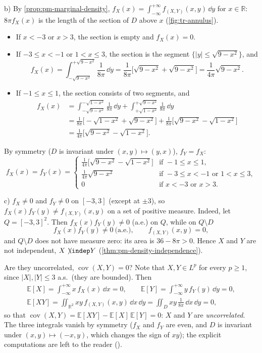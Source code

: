 \begin{example}
b) By \cref{prop:pm-marginal-density}, $f_X(x)=\int_{-\infty}^{+\infty}f_{(X,Y)}(x,y)\,\dd y$ for
$x\in\mathbb R$: $8\pi f_X(x)$ is the length of the section of $D$ above $x$
(\cref{fig:tr-annulus}).
\begin{itemize}
  \item If $x<-3$ or $x>3$, the section is empty and $f_X(x)=0$.
  \item If $-3\le x<-1$ or $1<x\le3$, the section is the segment
    $\{|y|\le\sqrt{9-x^2}\}$, and
    \[
      f_X(x)=\int_{-\sqrt{9-x^2}}^{+\sqrt{9-x^2}}\frac1{8\pi}\,\dd y=\frac1{8\pi}\Big[\sqrt{9-x^2}+\sqrt{9-x^2}\Big]
      =\frac1{4\pi}\sqrt{9-x^2}.
    \]
  \item If $-1\le x\le1$, the section consists of two segments, and
    \[
    \begin{aligned}
      f_X(x)&=\int_{-\sqrt{9-x^2}}^{-\sqrt{1-x^2}}\frac1{8\pi}\,\dd y+\int_{+\sqrt{1-x^2}}^{+\sqrt{9-x^2}}\frac1{8\pi}\,\dd y\\
      &=\frac1{8\pi}\Big[-\sqrt{1-x^2}+\sqrt{9-x^2}\Big]+\frac1{8\pi}\Big[\sqrt{9-x^2}-\sqrt{1-x^2}\Big]\\
      &=\frac1{4\pi}\Big[\sqrt{9-x^2}-\sqrt{1-x^2}\Big].
    \end{aligned}
    \]
\end{itemize}
By symmetry ($D$ is invariant under $(x,y)\mapsto(y,x)$), $f_Y=f_X$:
\[
  f_X(x)=f_Y(x)=\begin{cases}
    \frac1{4\pi}\big[\sqrt{9-x^2}-\sqrt{1-x^2}\big]&\text{if }-1\le x\le1,\\[3pt]
    \frac1{4\pi}\sqrt{9-x^2}&\text{if }-3\le x<-1\text{ or }1<x\le3,\\[3pt]
    0&\text{if }x<-3\text{ or }x>3.
  \end{cases}
\]

c) $f_X\ne0$ and $f_Y\ne0$ on $[-3,3]$ (except at $\pm3$), so $f_X(x)f_Y(y)\ne f_{(X,Y)}(x,y)$
on a set of positive measure. Indeed, let $Q=[-3,3]^2$. Then $f_X(x)f_Y(y)\ne0$ (a.e.) on $Q$,
while on $Q\setminus D$
\[
  f_X(x)f_Y(y)\ne0\ \text{(a.e.)},\qquad f_{(X,Y)}(x,y)=0,
\]
and $Q\setminus D$ does not have measure zero: its area is $36-8\pi>0$. Hence $X$ and $Y$ are not
independent, $X\not\!\indep Y$ (\cref{thm:pm-density-independence}).

Are they uncorrelated, $\operatorname{cov}(X,Y)=0$? Note that $X,Y\in L^p$ for every $p\ge1$,
since $|X|,|Y|\le3$ a.s.\ (they are bounded). Then
\[
\begin{gathered}
  \mathbb E[X]=\int_{-\infty}^{+\infty}x\,f_X(x)\,\dd x=0,\qquad
  \mathbb E[Y]=\int_{-\infty}^{+\infty}y\,f_Y(y)\,\dd y=0,\\
  \mathbb E[XY]=\iint_{\mathbb R^2}xy\,f_{(X,Y)}(x,y)\,\dd x\,\dd y=\iint_Dxy\,\frac1{8\pi}\,\dd x\,\dd y=0,
\end{gathered}
\]
so that $\operatorname{cov}(X,Y)=\mathbb E[XY]-\mathbb E[X]\,\mathbb E[Y]=0$: $X$ and $Y$ are
\emph{uncorrelated}. The three integrals vanish by symmetry ($f_X$ and $f_Y$ are even, and $D$ is
invariant under $(x,y)\mapsto(-x,y)$, which changes the sign of $xy$); the explicit computations
are left to the reader ().
\end{example}

